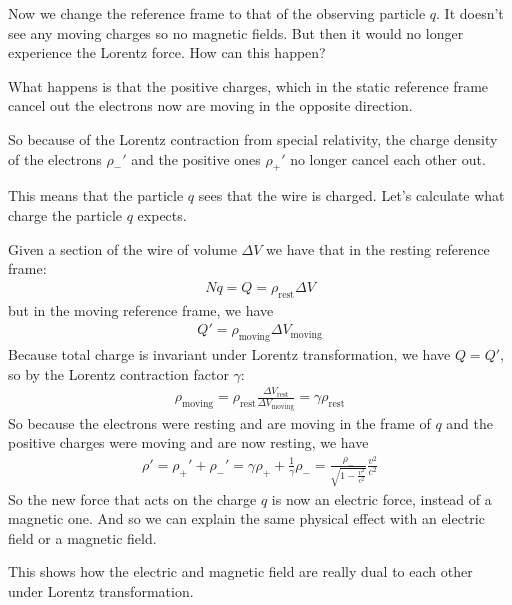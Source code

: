 Now we change the reference frame to that of the observing particle $q$.
It doesn't see any moving charges so no magnetic fields. 
But then it would no longer experience the Lorentz force.
How can this happen?

What happens is that the positive charges, which in the static reference frame cancel out the electrons now are moving in the opposite direction.

So because of the Lorentz contraction from special relativity, the charge density of the electrons $\rho_{-}'$ and the positive ones $\rho_{+}'$ no longer cancel each other out.

This means that the particle $q$ sees that the wire is charged.
Let's calculate what charge the particle $q$ expects.

Given a section of the wire of volume $\Delta V$ we have that in the resting reference frame:
\begin{align*}
 Nq = Q = \rho_{\text{rest}} \Delta V
\end{align*}
but in the moving reference frame, we have
\begin{align*}
  Q' = \rho_{\text{moving}} \Delta V_{\text{moving}}
\end{align*}
Because total charge is invariant under Lorentz transformation, we have $Q = Q'$, so by the Lorentz contraction factor $\gamma$:
\begin{align*}
  \rho_{\text{moving}} = \rho_{\text{rest}} \frac{\Delta V_{\text{rest}}}{\Delta V_{\text{moving}}} = \gamma \rho_{\text{rest}}
\end{align*}
So because the electrons were resting and are moving in the frame of $q$ and the positive charges were moving and are now resting, we have
\begin{align*}
  \rho' = \rho_{+}' + \rho_{-}' = \gamma \rho_{+} + \frac{1}{\gamma} \rho_{-}
  = \frac{\rho_{-}}{\sqrt{1 - \frac{v^{2}}{c^{2}}}} \frac{v^{2}}{c^{2}}
\end{align*}
So the new force that acts on the charge $q$ is now an electric force, instead of a magnetic one. 
And so we can explain the same physical effect with an electric field or a magnetic field.

This shows how the electric and magnetic field are really dual to each other under Lorentz transformation.
